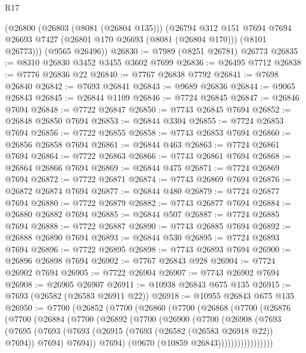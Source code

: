 \begin{lexlean}{R17}
\begin{coremodule}
      (@26800
        (@26803 (@8081 (@26804 @135)))
        (@26794
          @312
          @151
          @7694
          @7694
          @26693
          @7427
          (@26801 @170 @26693 (@8081 (@26804 @170)))
          (@8101 @26773)))
      (@9565 @26496))
@26830 := @7989 (@8251 @26781) @26773
@26835 := @8310 @26830 @3452 @3455 @3602 @7699
@26836 := @26495 @7712
@26838 := @7776 @26836 @22
@26840 := @7767 @26838 @7792
@26841 := @7698 @26840
@26842 := @7693 @26841
@26843 := @9689 @26836
@26844 := @9065 @26843
@26845 := @26844 @1109
@26846 := @7724 @26845
@26847 := @26846 @7694
@26848 := @7722 @26847
@26850 := @7743 @26845 @7694
@26852 := @26848 @26850 @7694
@26853 := @26844 @3304
@26855 := @7724 @26853 @7694
@26856 := @7722 @26855
@26858 := @7743 @26853 @7694
@26860 := @26856 @26858 @7694
@26861 := @26844 @463
@26863 := @7724 @26861 @7694
@26864 := @7722 @26863
@26866 := @7743 @26861 @7694
@26868 := @26864 @26866 @7694
@26869 := @26844 @475
@26871 := @7724 @26869 @7694
@26872 := @7722 @26871
@26874 := @7743 @26869 @7694
@26876 := @26872 @26874 @7694
@26877 := @26844 @480
@26879 := @7724 @26877 @7694
@26880 := @7722 @26879
@26882 := @7743 @26877 @7694
@26884 := @26880 @26882 @7694
@26885 := @26844 @507
@26887 := @7724 @26885 @7694
@26888 := @7722 @26887
@26890 := @7743 @26885 @7694
@26892 := @26888 @26890 @7694
@26893 := @26844 @530
@26895 := @7724 @26893 @7694
@26896 := @7722 @26895
@26898 := @7743 @26893 @7694
@26900 := @26896 @26898 @7694
@26902 := @7767 @26843 @928
@26904 := @7724 @26902 @7694
@26905 := @7722 @26904
@26907 := @7743 @26902 @7694
@26908 := @26905 @26907
@26911 := @10938 @26843 @675 @135
@26915 := @7693 (@26582 (@26583 @26911 @22))
@26918 := @10955 @26843 @675 @135
@26950 := @7700
    (@26852
      (@7700
        (@26860
          (@7700
            (@26868
              (@7700
                (@26876
                  (@7700
                    (@26884
                      (@7700
                        (@26892
                          (@7700
                            (@26900
                              (@7700
                                (@26908
                                  (@7693
                                    (@7695
                                      (@7693
                                        (@7693
                                          (@26915 (@7693 (@26582 (@26583 @26918 @22)) @7694))
                                          @7694)
                                        @7694))
                                    @7694)
                                  (@9670 (@10859 @26843)))))))))))))))))

\end{coremodule}
\end{lexlean}
